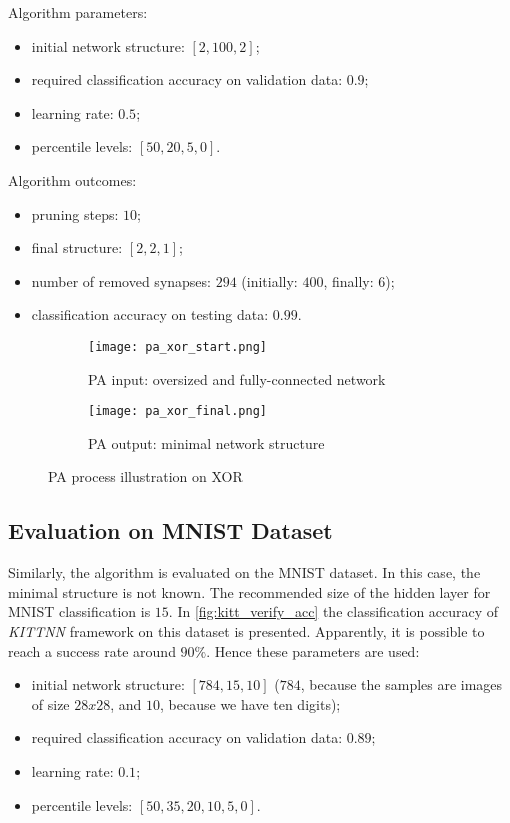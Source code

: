 Algorithm parameters:
\begin{itemize}
\item initial network structure: $ [2, 100, 2] $;
\item required classification accuracy on validation data: $ 0.9 $;
\item learning rate: $ 0.5 $;
\item percentile levels: $ [50, 20, 5, 0] $.
\end{itemize}

Algorithm outcomes:
\begin{itemize}
\item pruning steps: $ 10 $;
\item final structure: $ [2, 2, 1] $;
\item number of removed synapses: $ 294 $ (initially: $ 400 $, finally: $ 6 $);
\item classification accuracy on testing data: $ 0.99 $.
\end{itemize}

\begin{figure}[H]
\centering
\begin{subfigure}{0.4\textwidth}
  \centering
  \texttt{[image: pa\_xor\_start.png]}
  \caption{PA input: oversized and fully-connected network}
  \label{img:pa_xor_start}
\end{subfigure}%
\begin{subfigure}{0.4\textwidth}
  \centering
  \texttt{[image: pa\_xor\_final.png]}
  \caption{PA output: minimal network structure}
  \label{img:pa_xor_final}
\end{subfigure}
\caption{PA process illustration on XOR}
\label{img:pa_xor_morph}
\end{figure}

\subsection{Evaluation on MNIST Dataset} \label{ssec:evaluation_on_mnist}
Similarly, the algorithm is evaluated on the MNIST dataset. In this case, the minimal structure is not known. The recommended size of the hidden layer for MNIST classification is $ 15 $. In \cref{fig:kitt_verify_acc} the classification accuracy of \textit{KITTNN} framework on this dataset is presented. Apparently, it is possible to reach a success rate around $ 90\% $. Hence these parameters are used:

\begin{itemize}
\item initial network structure: $ [784, 15, 10] $ ($ 784 $, because the samples are images of size $ 28x28 $, and $ 10 $, because we have ten digits);
\item required classification accuracy on validation data: $ 0.89 $;
\item learning rate: $ 0.1 $;
\item percentile levels: $ [50, 35, 20, 10, 5, 0] $.
\end{itemize}

